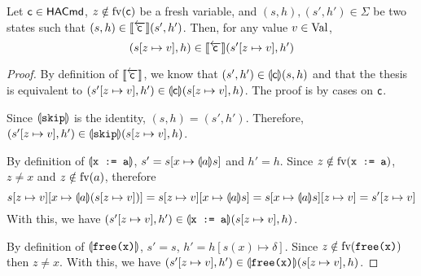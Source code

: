 \begin{lemma}\label{lmm:app:semantics-fresh-substitution}
	Let $\mathsf{c} \in \mathsf{HACmd}$, $z \notin \text{fv}(\mathsf{c})$ be a fresh variable, and $(s, h), (s', h') \in \Sigma$ be two states such that $(s, h) \in \llbracket\overleftarrow{\mathsf{c}}\rrbracket (s', h')$. Then, for any value $v \in \text{Val}$,
	\[
	(s[z \mapsto v], h) \in \llbracket\overleftarrow{\mathsf{c}}\rrbracket (s'[z \mapsto v], h')
	\]
\end{lemma}
\begin{proof}
	By definition of $\llbracket\overleftarrow{\mathsf{c}}\rrbracket$, we know that $(s', h') \in \llparenthesis\mathsf{c}\rrparenthesis (s, h)$ and that the thesis is equivalent to $(s'[z \mapsto v], h') \in \llparenthesis\mathsf{c}\rrparenthesis (s[z \mapsto v], h)$.
	The proof is by cases on $\mathsf{c}$.

	Since $\llparenthesis\texttt{skip}\rrparenthesis$ is the identity, $(s, h) = (s', h')$. Therefore, $(s'[z \mapsto v], h') \in \llparenthesis\texttt{skip}\rrparenthesis (s[z \mapsto v], h)$.

	By definition of $\llparenthesis\texttt{x := a}\rrparenthesis$, $s' = s[x \mapsto \llparenthesis a\rrparenthesis s]$ and $h' = h$. Since $z \notin \text{fv}(\texttt{x := a})$, $z \neq x$ and $z \notin \text{fv}(a)$, therefore
	\[
	s[z \mapsto v][x \mapsto \llparenthesis a\rrparenthesis(s[z \mapsto v])] = s[z \mapsto v][x \mapsto \llparenthesis a\rrparenthesis s] = s[x \mapsto \llparenthesis a\rrparenthesis s][z \mapsto v] = s'[z \mapsto v]
	\]
	With this, we have $(s'[z \mapsto v], h') \in \llparenthesis\texttt{x := a}\rrparenthesis(s[z \mapsto v], h)$.

	By definition of $\llparenthesis\texttt{free(x)}\rrparenthesis$, $s' = s$, $h' = h[s(x) \mapsto \delta]$. Since $z \notin \text{fv}(\texttt{free(x)})$ then $z \neq x$. With this, we have $(s'[z \mapsto v], h') \in \llparenthesis\texttt{free(x)}\rrparenthesis (s[z \mapsto v], h)$.
\end{proof}

